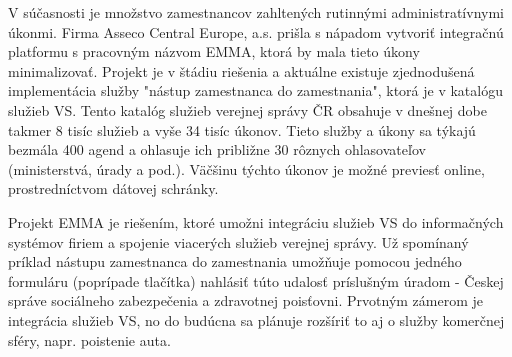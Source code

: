 %


\startthesis
\startbodymatter

V súčasnosti je množstvo zamestnancov zahltených rutinnými administratívnymi úkonmi. Firma Asseco Central Europe, a.s. prišla s nápadom vytvoriť integračnú platformu s pracovným názvom EMMA, ktorá by mala tieto úkony minimalizovať. Projekt je v štádiu riešenia a aktuálne existuje zjednodušená implementácia služby "nástup zamestnanca do zamestnania", ktorá je v katalógu služieb VS. Tento katalóg služieb verejnej správy ČR obsahuje v dnešnej dobe takmer 8 tisíc služieb a vyše 34 tisíc úkonov.  Tieto služby a úkony sa týkajú bezmála 400 agend a ohlasuje ich približne 30 rôznych ohlasovateľov (ministerstvá, úrady a pod.). Väčšinu týchto úkonov je možné previesť online, prostredníctvom dátovej schránky. 

Projekt EMMA je riešením, ktoré umožni integráciu služieb VS do informačných systémov firiem a spojenie viacerých služieb verejnej správy. Už spomínaný príklad nástupu zamestnanca do zamestnania umožňuje pomocou jedného formuláru (poprípade tlačítka) nahlásiť túto udalosť príslušným úradom - Českej správe sociálneho zabezpečenia a zdravotnej poisťovni. Prvotným zámerom je integrácia služieb VS, no do budúcna sa plánuje rozšíriť to aj o služby komerčnej sféry, napr. poistenie auta. 

